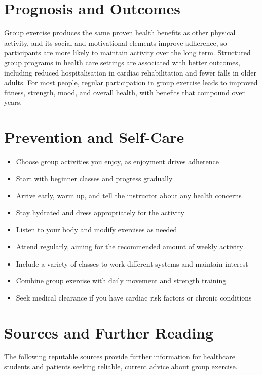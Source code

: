 \section*{Prognosis and Outcomes}
Group exercise produces the same proven health benefits as other physical activity, and its social and motivational elements improve adherence, so participants are more likely to maintain activity over the long term. Structured group programs in health care settings are associated with better outcomes, including reduced hospitalisation in cardiac rehabilitation and fewer falls in older adults. For most people, regular participation in group exercise leads to improved fitness, strength, mood, and overall health, with benefits that compound over years.

\section*{Prevention and Self-Care}
\begin{itemize}
    \item Choose group activities you enjoy, as enjoyment drives adherence
    \item Start with beginner classes and progress gradually
    \item Arrive early, warm up, and tell the instructor about any health concerns
    \item Stay hydrated and dress appropriately for the activity
    \item Listen to your body and modify exercises as needed
    \item Attend regularly, aiming for the recommended amount of weekly activity
    \item Include a variety of classes to work different systems and maintain interest
    \item Combine group exercise with daily movement and strength training
    \item Seek medical clearance if you have cardiac risk factors or chronic conditions
\end{itemize}

\section*{Sources and Further Reading}
The following reputable sources provide further information for healthcare students and patients seeking reliable, current advice about group exercise.

